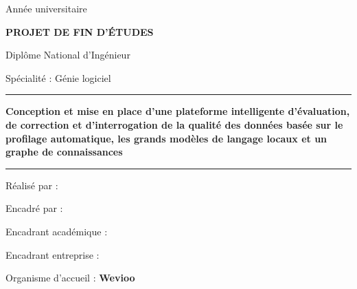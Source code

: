 \begin{titlepage}
  \thispagestyle{empty}
  \centering
  {\large \ecole\par}
  \vspace{0.5cm}
  {\large Année universitaire \anneeuniv\par}
  \vspace{1.5cm}
  {\Huge\bfseries\color{espritred} PROJET DE FIN D'ÉTUDES\par}
  \vspace{0.6cm}
  {\Large Diplôme National d'Ingénieur\par}
  {\large Spécialité : Génie logiciel\par}
  \vspace{1.2cm}
  \rule{\linewidth}{1pt}\par\vspace{0.4cm}
  {\LARGE\bfseries Conception et mise en place d'une plateforme intelligente d'évaluation, de correction et d'interrogation de la qualité des données basée sur le profilage automatique, les grands modèles de langage locaux et un graphe de connaissances\par}
  \vspace{0.4cm}\rule{\linewidth}{1pt}\par
  \vspace{1.5cm}
  {\large Réalisé par : \textbf{\etudiant}\par}
  \vspace{1cm}
  {\large Encadré par :\par}
  {\large Encadrant académique : \encadrantacad\par}
  {\large Encadrant entreprise : \encadrantpro\par}
  \vfill
  {\large Organisme d'accueil : \textbf{Wevioo}\par}
\end{titlepage}
